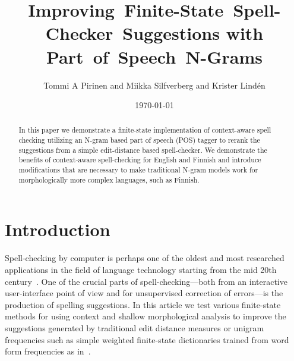 \documentclass{llncs}
\begin{document}
\title{Improving~Finite-State~Spell-Checker~Suggestions with 
Part~of~Speech~N-Grams}

\author{Tommi A Pirinen and Miikka Silfverberg and Krister Lind\'{e}n}


\date{\today}

\maketitle

\begin{abstract} 
In this paper we demonstrate a finite-state implementation of
context-aware spell checking utilizing an N-gram based part of speech (POS)
tagger to rerank the suggestions from a simple edit-distance based
spell-checker. We demonstrate the benefits of context-aware spell-checking for
English and Finnish and introduce modifications that are necessary to make
traditional N-gram models work for morphologically more complex languages, such
as Finnish.
\end{abstract}

\section{Introduction}

Spell-checking by computer is perhaps one of the oldest and most researched
applications in the field of language technology starting from the mid 20th
century~\cite{damerau/1964}. One of the crucial parts of spell-checking---both
from an interactive user-interface point of view and for unsupervised correction
of errors---is the production of spelling suggestions.  In this article we test
various finite-state methods for using context and shallow morphological
analysis to improve the suggestions generated by traditional edit distance
measures or unigram frequencies such as simple weighted
finite-state dictionaries trained from word form frequencies as 
in~\cite{pirinen/2010/lrec}.
\end{document}
